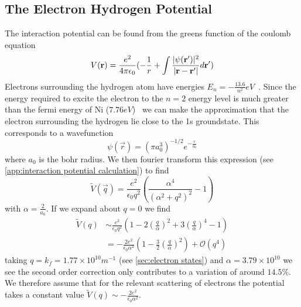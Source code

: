 \subsection{The Electron Hydrogen Potential}\label{sec:electron hydrogen potential}
The interaction potential can be found from
the greens function of the coulomb
equation~\cite{AQP_Problems}
\begin{equation}
    V(\mathbf{r}) = \frac{e^2}{4 \pi \epsilon_0}(
    -\frac{1}{r}
    + \int{\frac{\lvert\psi(\mathbf{r}')\rvert^2}{
            \lvert\mathbf{r} - \mathbf{r'}\rvert} d\mathbf{r}'})
\end{equation}
Electrons surrounding the hydrogen
atom have energies
\(E_n = -\frac{13.6}{n^2} eV\)~\cite{griffiths_schroeter_2018}.
Since the energy required to excite the electron
to the \(n=2\) energy level is much greater
than the fermi energy of Ni
(\(7.76eV\))~\cite{PhysRev.131.2469} we can
make the approximation that the electron surrounding
the hydrogen lie close to the 1s groundstate. This
corresponds to a wavefunction\cite{griffiths_schroeter_2018}
\begin{equation}
    \psi(\vec{r}) = {(\pi a_0^3)}^{-1/2} e^{-\frac{r}{a_0}}
\end{equation}
where \(a_0\) is
the bohr radius.
We then fourier
transform this expression
(see \cref{app:interaction potential calculation})
to find
\begin{equation}
    \tilde{V}(\vec{q}) = \frac{e^2}{\epsilon_0 q^2}(
    \frac{\alpha^4}{{(\alpha^2 + q^2)}^2} - 1
    )
\end{equation}
with \(\alpha = \frac{2}{a_0}\). If we expand
about \(q=0\) we find
\begin{align}
    \tilde{V}(q) & \sim \frac{e^2}{\epsilon_0 q^2}(1 - 2{(\frac{q}{\alpha})}^2 + 3 {(\frac{q}{\alpha})}^4 - 1)   \\
    {}           & = -\frac{2e^2}{\epsilon_0 \alpha^2}(1 - \frac{3}{2}{(\frac{q}{\alpha})}^2) + \mathcal{O}(q^4)
\end{align}
taking \(q = k_f = 1.77\times{}10^{10}m^{-1}\)
(see \cref{sec:electron states})
and \(\alpha = 3.79\times{}10^{10}\) we see the second
order correction only contributes to a variation
of around \(14.5\% \).
We therefore assume that for the relevant scattering
of electrons the potential takes a constant
value \(\tilde{V}(q) \sim -\frac{2e^2}{\epsilon_0 \alpha^2}\).

